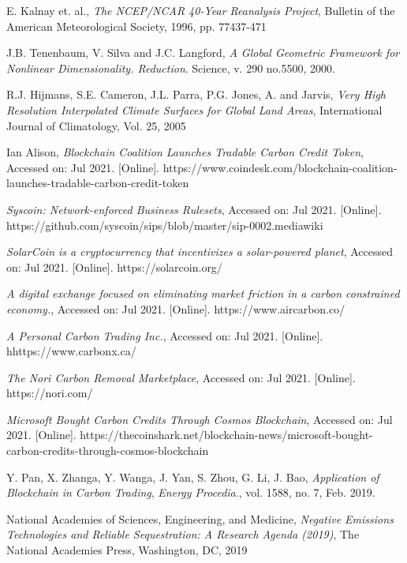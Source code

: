 \documentclass{article}
\begin{document}
\label{section:summary}

\begin{thebibliography}{1}


 E. Kalnay et. al., \textit{The NCEP/NCAR 40-Year Reanalysis Project}, Bulletin of the American Meteorological Society, 1996, pp. 77437-471

 J.B. Tenenbaum, V. Silva and J.C. Langford, \textit{A Global Geometric Framework for Nonlinear Dimensionality. Reduction}. Science, v. 290 no.5500, 2000.

 R.J. Hijmans, S.E. Cameron, J.L. Parra, P.G. Jones, A. and Jarvis, \textit{Very High Resolution Interpolated Climate Surfaces for Global Land Areas}, International Journal of Climatology, Vol. 25, 2005

 Ian Alison, \textit{Blockchain Coalition Launches Tradable Carbon Credit Token}, Accessed on: Jul 2021. [Online]. https://www.coindesk.com/blockchain-coalition-launches-tradable-carbon-credit-token

 \textit{Syscoin: Network-enforced Business Rulesets}, Accessed on: Jul 2021. [Online]. https://github.com/syscoin/sips/blob/master/sip-0002.mediawiki

 \textit{SolarCoin is a cryptocurrency that incentivizes a solar-powered planet}, Accessed on: Jul 2021. [Online]. https://solarcoin.org/

 \textit{A digital exchange focused on eliminating market friction in a carbon constrained economy.}, Accessed on: Jul 2021. [Online]. https://www.aircarbon.co/

 \textit{A Personal Carbon Trading Inc.}, Accessed on: Jul 2021. [Online]. hhttps://www.carbonx.ca/

 \textit{The Nori Carbon Removal Marketplace}, Accessed on: Jul 2021. [Online]. https://nori.com/

 \textit{Microsoft Bought Carbon Credits Through Cosmos Blockchain}, Accessed on: Jul 2021. [Online]. https://thecoinshark.net/blockchain-news/microsoft-bought-carbon-credits-through-cosmos-blockchain

 Y. Pan, X. Zhanga, Y. Wanga, J. Yan, S. Zhou, G. Li, J. Bao, \textit{Application of Blockchain in Carbon Trading}, \emph{Energy Procedia}., vol. 1588, no. 7, Feb. 2019.

 National Academies of Sciences, Engineering, and Medicine, \textit{Negative Emissions Technologies and Reliable Sequestration: A Research Agenda (2019)}, The National Academies Press, Washington, DC, 2019 


\end{thebibliography}
\end{document}

